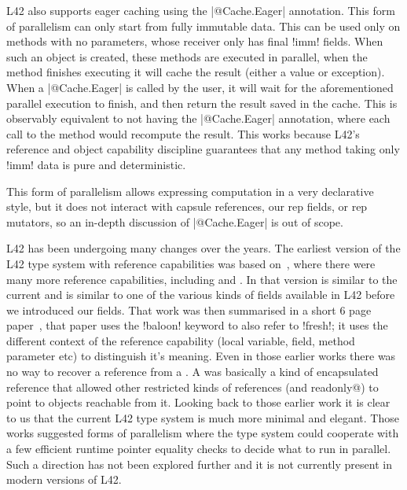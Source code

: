 L42 also supports eager caching using the \Q|@Cache.Eager| annotation.
This form of parallelism can only start from fully immutable data.
This can be used only on methods with no parameters,
whose receiver only has final \Q!imm! fields.
When such an object is created, these methods are executed in parallel, when the method finishes executing it will cache the result (either a value or exception).
When a \Q|@Cache.Eager| is called by the user, it will wait for the aforementioned parallel execution to finish, and then return the result saved in the cache.
This is observably equivalent to not having the \Q|@Cache.Eager| annotation, where each call to the method would recompute the result.
This works because L42's reference and object capability discipline guarantees that any method taking only \Q!imm! data is pure and deterministic.

This form of parallelism allows expressing computation in a very declarative style, but it does not interact with capsule references, our rep fields, or rep mutators, so an in-depth discussion of \Q|@Cache.Eager| is out of scope.

L42 has been undergoing many changes over the years.
The earliest version of the L42 type system with reference capabilities was based on~\cite{servettoballoon},
where there were many more reference capabilities, including
\Q@fresh@ and \Q@baloon@.
In that version \Q@fresh@ is similar to the current \Q@capsule@ and \Q@baloon@ is similar to one of the various kinds of \Q@capsule@ fields available in L42 before we introduced our \Q@rep@ fields.
That work was then summarised in a short 6 page paper~\cite{ServettoEtAl13a}, that
paper uses the \Q!baloon! keyword to also refer to \Q!fresh!; it uses the different context of the reference capability (local variable, field, method parameter etc) to distinguish it's meaning.
Even in those earlier works there was no way to recover a \Q@fresh@ reference from a \Q@baloon@. A \Q@baloon@ was basically a kind of encapsulated reference that allowed other restricted kinds of references (\Q@external@ and \Q@external readonly@) to point to objects reachable from it. Looking back to those earlier work it is clear to us that the current L42 type system is much more minimal and elegant.
Those works suggested forms of parallelism where the type system could cooperate with a few efficient runtime pointer equality checks to decide what to run in parallel.
Such a direction has not been explored further and it is not currently present in modern versions of L42.
